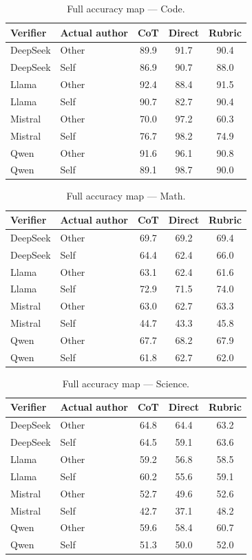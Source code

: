 \documentclass{article}
\begin{document}
\begin{table}[H]
\centering
\small
\caption{Full accuracy map --- Code.}
\label{tab:fullmap-code}
\begin{tabular}{llccc}
\toprule
Verifier & Actual author & CoT & Direct & Rubric \\
\midrule
DeepSeek & Other & 89.9 & 91.7 & 90.4 \\
DeepSeek & Self  & 86.9 & 90.7 & 88.0 \\
Llama    & Other & 92.4 & 88.4 & 91.5 \\
Llama    & Self  & 90.7 & 82.7 & 90.4 \\
Mistral  & Other & 70.0 & 97.2 & 60.3 \\
Mistral  & Self  & 76.7 & 98.2 & 74.9 \\
Qwen     & Other & 91.6 & 96.1 & 90.8 \\
Qwen     & Self  & 89.1 & 98.7 & 90.0 \\
\bottomrule
\end{tabular}
\end{table}

\begin{table}[H]
\centering
\small
\caption{Full accuracy map --- Math.}
\label{tab:fullmap-math}
\begin{tabular}{llccc}
\toprule
Verifier & Actual author & CoT & Direct & Rubric \\
\midrule
DeepSeek & Other & 69.7 & 69.2 & 69.4 \\
DeepSeek & Self  & 64.4 & 62.4 & 66.0 \\
Llama    & Other & 63.1 & 62.4 & 61.6 \\
Llama    & Self  & 72.9 & 71.5 & 74.0 \\
Mistral  & Other & 63.0 & 62.7 & 63.3 \\
Mistral  & Self  & 44.7 & 43.3 & 45.8 \\
Qwen     & Other & 67.7 & 68.2 & 67.9 \\
Qwen     & Self  & 61.8 & 62.7 & 62.0 \\
\bottomrule
\end{tabular}
\end{table}

\begin{table}[H]
\centering
\small
\caption{Full accuracy map --- Science.}
\label{tab:fullmap-science}
\begin{tabular}{llccc}
\toprule
Verifier & Actual author & CoT & Direct & Rubric \\
\midrule
DeepSeek & Other & 64.8 & 64.4 & 63.2 \\
DeepSeek & Self  & 64.5 & 59.1 & 63.6 \\
Llama    & Other & 59.2 & 56.8 & 58.5 \\
Llama    & Self  & 60.2 & 55.6 & 59.1 \\
Mistral  & Other & 52.7 & 49.6 & 52.6 \\
Mistral  & Self  & 42.7 & 37.1 & 48.2 \\
Qwen     & Other & 59.6 & 58.4 & 60.7 \\
Qwen     & Self  & 51.3 & 50.0 & 52.0 \\
\bottomrule
\end{tabular}
\end{table}
\end{document}
